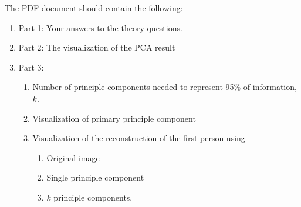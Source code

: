 \documentclass[12pt]{article}
\begin{document}
\noindent
The PDF document should contain the following:
\begin{enumerate}
\item Part 1: Your answers to the theory questions.
\item Part 2: The visualization of the PCA result
\item Part 3:
	\begin{enumerate}
	\item Number of principle components needed to represent 95\% of information, $k$.
	\item Visualization of primary principle component
	\item Visualization of the reconstruction of the first person using
		\begin{enumerate}
		\item Original image
		\item Single principle component
		\item $k$ principle components.
		\end{enumerate}
	\end{enumerate}
\end{enumerate}
\end{document}
